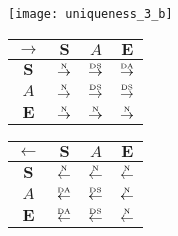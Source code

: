 \begin{figure}[htbp]\ContinuedFloat
  \centering
  \begin{subfigure}{1\textwidth}
    \centering
    \begin{minipage}[b]{1\textwidth}
      \centering
      \texttt{[image: uniqueness\_3\_b]}
    \end{minipage}
    \begin{minipage}[b]{0.3\textwidth}
      \vspace{1em}
      \centering
      \begin{tabular}{|c|c|c|c|} \hline
        $\rightarrow$ & $\bm{S}$ & $A$ & $\bm{E}$\\ \hline
        $\bm{S}$ & $\overset{\text{\tiny{N}}}{\rightarrow}$ & $\overset{\text{\tiny{DS}}}{\rightarrow}$ & $\overset{\text{\tiny{DA}}}{\rightarrow}$\\ \hline
        $A$ & $\overset{\text{\tiny{N}}}{\rightarrow}$ & $\overset{\text{\tiny{DS}}}{\rightarrow}$ & $\overset{\text{\tiny{DS}}}{\rightarrow}$\\ \hline
        $\bm{E}$ & $\overset{\text{\tiny{N}}}{\rightarrow}$ & $\overset{\text{\tiny{N}}}{\rightarrow}$ & $\overset{\text{\tiny{N}}}{\rightarrow}$\\ \hline
      \end{tabular}
    \end{minipage}
    \begin{minipage}[b]{0.3\textwidth}
      \vspace{1em}
      \centering
      \begin{tabular}{|c|c|c|c|} \hline
        $\leftarrow$ & $\bm{S}$ & $A$ & $\bm{E}$\\ \hline
        $\bm{S}$ & $\overset{\text{\tiny{N}}}{\leftarrow}$ & $\overset{\text{\tiny{N}}}{\leftarrow}$ & $\overset{\text{\tiny{N}}}{\leftarrow}$\\ \hline
        $A$ & $\overset{\text{\tiny{DA}}}{\leftarrow}$ & $\overset{\text{\tiny{DS}}}{\leftarrow}$ & $\overset{\text{\tiny{N}}}{\leftarrow}$\\ \hline
        $\bm{E}$ & $\overset{\text{\tiny{DA}}}{\leftarrow}$ & $\overset{\text{\tiny{DS}}}{\leftarrow}$ & $\overset{\text{\tiny{N}}}{\leftarrow}$\\ \hline
      \end{tabular}
    \end{minipage}
    \begin{minipage}[b]{0.3\textwidth}
      \vspace{1em}
      \centering

\end{minipage}
\end{subfigure}
\end{figure}
